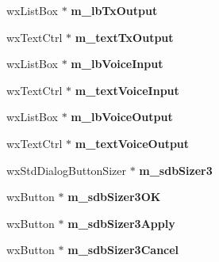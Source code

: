 \begin{DoxyCompactItemize}
\item 
\hypertarget{class_dlg_audio_a7a15f882dd0791867d7284cc4b043ca2}{wx\-List\-Box $\ast$ {\bfseries m\-\_\-lb\-Tx\-Output}}\label{class_dlg_audio_a7a15f882dd0791867d7284cc4b043ca2}

\item 
\hypertarget{class_dlg_audio_a9a7b73374404fee2e3ce1b742ce5e563}{wx\-Text\-Ctrl $\ast$ {\bfseries m\-\_\-text\-Tx\-Output}}\label{class_dlg_audio_a9a7b73374404fee2e3ce1b742ce5e563}

\item 
\hypertarget{class_dlg_audio_a022070976a0bc9ffb78bea4298f759aa}{wx\-List\-Box $\ast$ {\bfseries m\-\_\-lb\-Voice\-Input}}\label{class_dlg_audio_a022070976a0bc9ffb78bea4298f759aa}

\item 
\hypertarget{class_dlg_audio_a900d174fd432c0e70d6f3fccd24e723b}{wx\-Text\-Ctrl $\ast$ {\bfseries m\-\_\-text\-Voice\-Input}}\label{class_dlg_audio_a900d174fd432c0e70d6f3fccd24e723b}

\item 
\hypertarget{class_dlg_audio_a75f209f62dd213b4236624f019f611e1}{wx\-List\-Box $\ast$ {\bfseries m\-\_\-lb\-Voice\-Output}}\label{class_dlg_audio_a75f209f62dd213b4236624f019f611e1}

\item 
\hypertarget{class_dlg_audio_a24ed8e4513996b1d938fbc6977d883a4}{wx\-Text\-Ctrl $\ast$ {\bfseries m\-\_\-text\-Voice\-Output}}\label{class_dlg_audio_a24ed8e4513996b1d938fbc6977d883a4}

\item 
\hypertarget{class_dlg_audio_aa2834821c2fcae88fbedf3abfb9d69e0}{wx\-Std\-Dialog\-Button\-Sizer $\ast$ {\bfseries m\-\_\-sdb\-Sizer3}}\label{class_dlg_audio_aa2834821c2fcae88fbedf3abfb9d69e0}

\item 
\hypertarget{class_dlg_audio_a81c75edcacae099633853ee775d72de9}{wx\-Button $\ast$ {\bfseries m\-\_\-sdb\-Sizer3\-O\-K}}\label{class_dlg_audio_a81c75edcacae099633853ee775d72de9}

\item 
\hypertarget{class_dlg_audio_a2a6d0fffd35e01a0b59c22164625e6c3}{wx\-Button $\ast$ {\bfseries m\-\_\-sdb\-Sizer3\-Apply}}\label{class_dlg_audio_a2a6d0fffd35e01a0b59c22164625e6c3}

\item 
\hypertarget{class_dlg_audio_a749b04f8606ba939394d75267f8003ce}{wx\-Button $\ast$ {\bfseries m\-\_\-sdb\-Sizer3\-Cancel}}\label{class_dlg_audio_a749b04f8606ba939394d75267f8003ce}

\end{DoxyCompactItemize}


